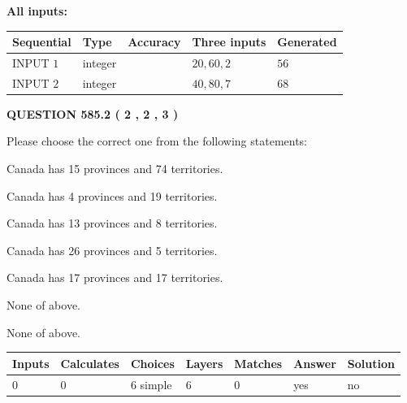 \documentclass[12pt]{article}
\begin{document}
   
   
   
\noindent\vspace{0.1in}\hspace{-0.08in} {\textbf{\Large{All inputs: }}}
   
   
  
  
\noindent\begin{tabular}{|l|l|l|l|l|}
\hline
 Sequential & Type & Accuracy & Three inputs & Generated \\ 
\hline
 
 
  INPUT $  1 $ & integer &  & $
 20
 , 
 60
 , 
 2
 $ & $ 56 $ 
 \\  \hline  
 
 
  INPUT $  2 $ & integer &  & $
 40
 , 
 80
 , 
 7
 $ & $ 68 $ 
 \\  \hline  
 \end{tabular}
   
   
  
\vspace{0.2in}
  
{\textbf{\Large{QUESTION
585.2 
 ( 2 , 2 , 3 )
}}}
  
  
Please choose the correct one from the following statements:
 
 
Canada has  15 provinces and  74 territories.
 
 
Canada has   4 provinces and  19 territories.
 
 
Canada has  13 provinces and  8 territories.
 
 
Canada has  26 provinces and  5 territories.
 
 
Canada has  17 provinces and  17 territories.
 
 
 None of above.
 
 
\noindent{}
 
 
 None of above.
 
 
\noindent{}
 
 
   
   
   
   
\noindent\begin{tabular}{|l|l|l|l|l|l|l|}
 \hline
Inputs & Calculates & Choices & Layers & Matches & Answer & Solution \\ \hline
 0  & 
 0  & 
 6
  simple  
  & 
 6  & 
 0  & 
  yes & 
  no 
  \\ \hline
 \end{tabular}
   
\end{document}

